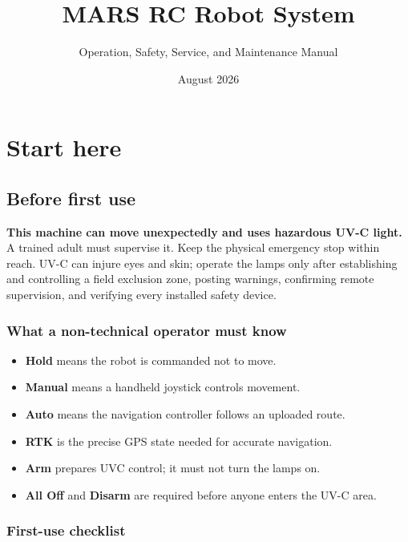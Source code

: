 \documentclass[
  10pt,
  letterpaper,
  openany]{report}
\title{MARS RC Robot System}
\subtitle{Operation, Safety, Service, and Maintenance Manual}
\author{}
\date{August 2026}
\providecommand{\tightlist}{%
  \setlength{\itemsep}{0pt}\setlength{\parskip}{0pt}}
\begin{document}
\maketitle

{
\setcounter{tocdepth}{2}
\tableofcontents
}
\chapter{Start here}\label{start-here}

\protect{}\label{start}
\section{Before first use}\label{before-first-use}

\begin{manualdanger}

\textbf{This machine can move unexpectedly and uses hazardous UV-C
light.} A trained adult must supervise it. Keep the physical emergency
stop within reach. UV-C can injure eyes and skin; operate the lamps only
after establishing and controlling a field exclusion zone, posting
warnings, confirming remote supervision, and verifying every installed
safety device.

\end{manualdanger}

\subsection{What a non-technical operator must
know}\label{what-a-non-technical-operator-must-know}

\begin{itemize}
\tightlist
\item
  \textbf{Hold} means the robot is commanded not to move.
\item
  \textbf{Manual} means a handheld joystick controls movement.
\item
  \textbf{Auto} means the navigation controller follows an uploaded
  route.
\item
  \textbf{RTK} is the precise GPS state needed for accurate navigation.
\item
  \textbf{Arm} prepares UVC control; it must not turn the lamps on.
\item
  \textbf{All Off} and \textbf{Disarm} are required before anyone enters
  the UV-C area.
\end{itemize}

\subsection{First-use checklist}\label{first-use-checklist}
\end{document}
